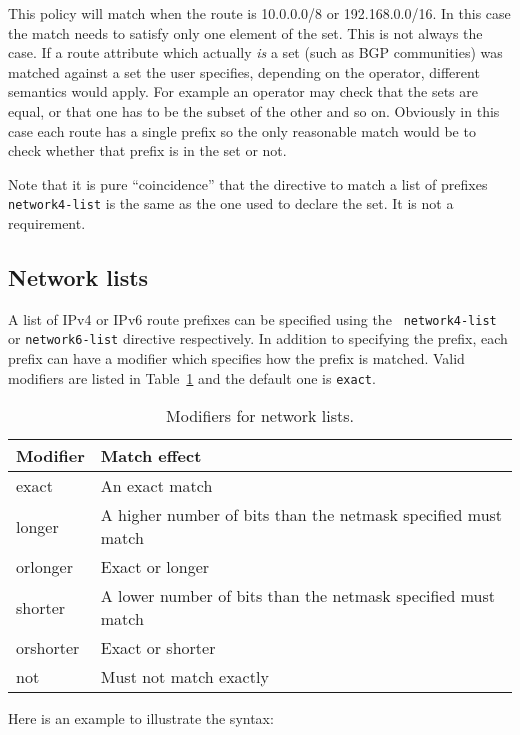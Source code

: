 This policy will match when the route is 10.0.0.0/8 or 192.168.0.0/16.  In this
case the match needs to satisfy only one element of the set.  This is not always
the case.  If a route attribute which actually {\em is} a set (such as BGP
communities) was matched against a set the user specifies, depending on the
operator, different semantics would apply.  For example an operator may check
that the sets are equal, or that one has to be the subset of the other and so
on.  Obviously in this case each route has a single prefix so the only
reasonable match would be to check whether that prefix is in the set or not.

Note that it is pure ``coincidence'' that the directive to match a list of
prefixes {\tt network4-list} is the same as the one used to declare the set.  It
is not a requirement.

\subsection{Network lists}
A list of IPv4 or IPv6 route prefixes can be specified using the {\tt
network4-list} or {\tt network6-list} directive respectively.  In addition to
specifying the prefix, each prefix can have a modifier which specifies how the
prefix is matched.  Valid modifiers are listed in Table~\ref{tab:policy:mod} and
the default one is {\tt exact}.
\begin{table}
\begin{center}
\begin{tabular}{|l|l|}
\hline
Modifier  & Match effect \\
\hline\hline
exact	  & An exact match \\
\hline
longer	  & A higher number of bits than the netmask specified must match \\
\hline
orlonger  & Exact or longer \\
\hline
shorter	  & A lower number of bits than the netmask specified must match \\
\hline
orshorter & Exact or shorter \\
\hline
not	  & Must not match exactly \\
\hline
\end{tabular}
\end{center}
\caption{\label{tab:policy:mod}Modifiers for network lists.}
\end{table}

Here is an example to illustrate the syntax:

